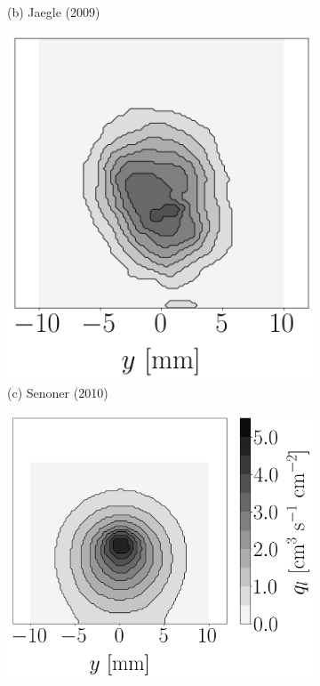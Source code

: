 \begin{figure}[h!]
\begin{subfigure}[b]{0.2\textwidth}
   \caption*{(b) Jaegle (2009)}
\end{subfigure}
\hspace*{0.05in}
\begin{subfigure}[b]{0.2\textwidth}
	\flushleft
   \includegraphics[scale=0.225]{./part2_developments/figures_ch6_lagrangian_JICF/previous_numerical_results/map_senoner}
   \caption*{(c) Senoner (2010)}
\end{subfigure}
\hspace*{0.05in}
\begin{subfigure}[b]{0.2\textwidth}
	\flushleft
   \includegraphics[scale=0.225]{./part2_developments/figures_ch6_lagrangian_JICF/previous_numerical_results/map_eckel}

\end{subfigure}
\end{figure}
